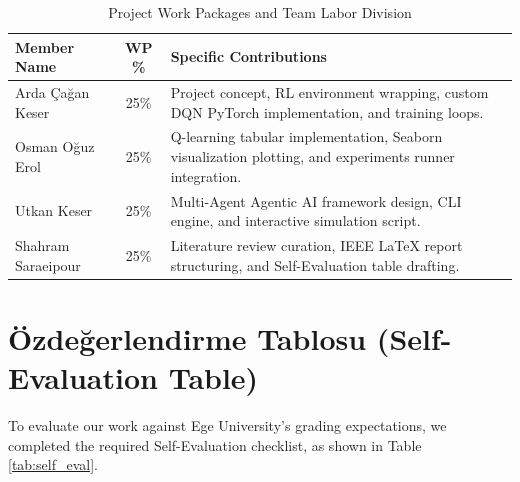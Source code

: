 \documentclass[conference]{IEEEtran}
\begin{document}
\begin{table}[htbp]
\caption{Project Work Packages and Team Labor Division}
\label{tab:division}
\begin{center}
\begin{tabular}{|l|c|l|}
\hline
\textbf{Member Name} & \textbf{WP \%} & \textbf{Specific Contributions} \\
\hline
Arda Çağan Keser & 25\% & Project concept, RL environment wrapping, custom DQN PyTorch implementation, and training loops. \\
Osman Oğuz Erol & 25\% & Q-learning tabular implementation, Seaborn visualization plotting, and experiments runner integration. \\
Utkan Keser & 25\% & Multi-Agent Agentic AI framework design, CLI engine, and interactive simulation script. \\
Shahram Saraeipour & 25\% & Literature review curation, IEEE LaTeX report structuring, and Self-Evaluation table drafting. \\
\hline
\end{tabular}
\end{center}
\end{table}

\newpage

\section*{Özdeğerlendirme Tablosu (Self-Evaluation Table)}
To evaluate our work against Ege University's grading expectations, we completed the required Self-Evaluation checklist, as shown in Table \ref{tab:self_eval}.
\end{document}
